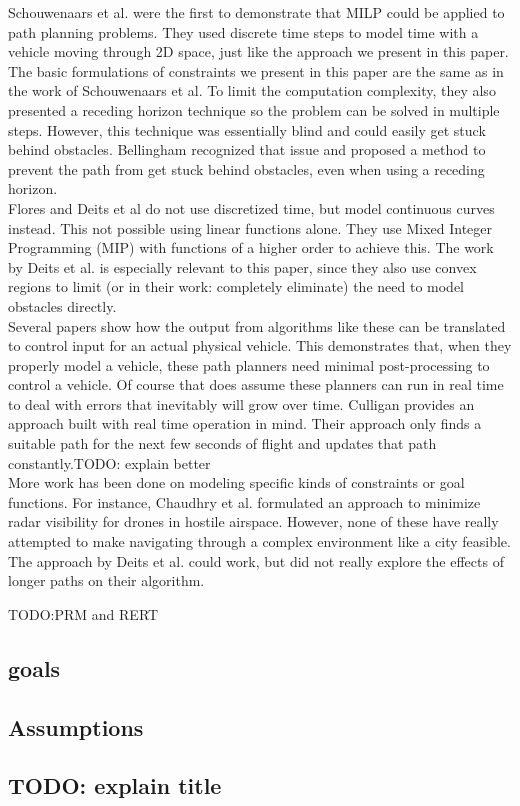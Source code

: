 Schouwenaars et al. \cite{Schouwenaars2001} were the first to demonstrate that MILP could be applied to path planning problems. They used discrete time steps to model time with a vehicle moving through 2D space, just like the approach we present in this paper. The basic formulations of constraints we present in this paper are the same as in the work of Schouwenaars et al. To limit the computation complexity, they also presented a receding horizon technique so the problem can be solved in multiple steps. However, this technique was essentially blind and could easily get stuck behind obstacles. Bellingham\cite{Bellingham2002} recognized that issue and proposed a method to prevent the path from get stuck behind obstacles, even when using a receding horizon. \\

Flores\cite{Flores2007} and Deits et al\cite{Deits2015} do not use discretized time, but model continuous curves instead. This not possible using linear functions alone. They use Mixed Integer Programming (MIP) with functions of a higher order to achieve this. The work by Deits et al. is especially relevant to this paper, since they also use convex regions to limit (or in their work: completely eliminate) the need to model obstacles directly. \\

Several papers \cite{Fliess1995a, Hao2005, Cowling2007, Mellinger2011} show how the output from algorithms like these can be translated to control input for an actual physical vehicle. This demonstrates that, when they properly model a vehicle, these path planners need minimal post-processing to control a vehicle. Of course that does assume these planners can run in real time to deal with errors that inevitably will grow over time. Culligan \cite{Culligan2006} provides an approach built with real time operation in mind. Their approach only finds a suitable path for the next few seconds of flight and updates that path constantly.TODO: explain better \\

More work has been done on modeling specific kinds of constraints or goal functions. For instance, Chaudhry et al. \cite{Chaudhry2004} formulated an approach to minimize radar visibility for drones in hostile airspace. However, none of these have really attempted to make navigating through a complex environment like a city feasible. The approach by Deits et al. \cite{Deits2015} could work, but did not really explore the effects of longer paths on their algorithm.

TODO:PRM and RERT \\


\subsection{goals}

\subsection{Assumptions}
\subsection{TODO: explain title}